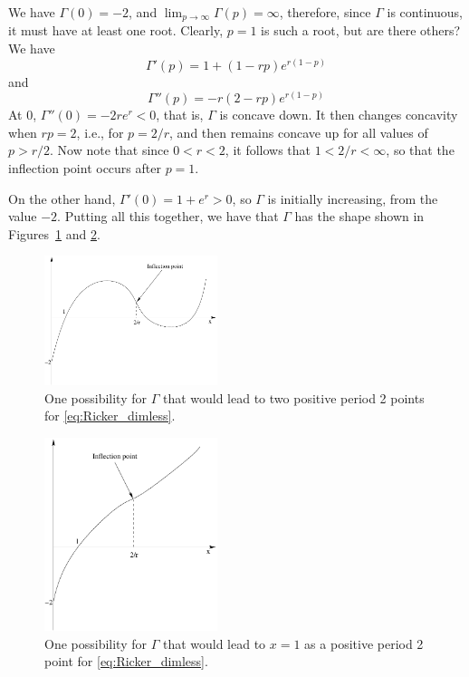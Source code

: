\documentclass[12pt]{article}
\theoremstyle{plain}
\begin{document}
We have $\Gamma(0)=-2$, and $\lim_{p\to\infty}\Gamma(p)=\infty$, therefore,
since $\Gamma$ is continuous, it must have at least one root. Clearly, $p=1$ is
such a root, but are there others?
We have
\begin{equation}\label{eq:dGamma}
\Gamma'(p)=1+(1-rp)e^{r(1-p)}
\end{equation}
and
\[
\Gamma''(p)=-r(2-rp)e^{r(1-p)}
\]
At $0$, $\Gamma''(0)=-2re^r<0$, that is, $\Gamma$ is concave down. It then changes concavity when $rp=2$, i.e., for $p=2/r$, and then remains concave up for all values of $p>r/2$. Now note that since $0<r<2$, it follows that $1<2/r<\infty$, so that the inflection point occurs after $p=1$.

On the other hand, $\Gamma'(0)=1+e^r>0$, so $\Gamma$ is initially increasing, from the value $-2$. Putting all this together, we have that $\Gamma$ has the shape shown in Figures~\ref{fig:Gamma_1} and \ref{fig:Gamma_2}.

\begin{figure}[htbp]
\begin{center}
\includegraphics[width=0.45\textwidth]{winter2008_assign1_fig1_a}
\caption{One possibility for $\Gamma$ that would lead to two positive period 2 points for \eqref{eq:Ricker_dimless}.}
\label{fig:Gamma_1}
\end{center}
\end{figure}


\begin{figure}[htbp]
\begin{center}
\includegraphics[width=0.45\textwidth]{winter2008_assign1_fig1_b}
\caption{One possibility for $\Gamma$ that would lead to $x=1$ as a positive period 2 point for \eqref{eq:Ricker_dimless}.}
\label{fig:Gamma_2}
\end{center}
\end{figure}
\end{document}
